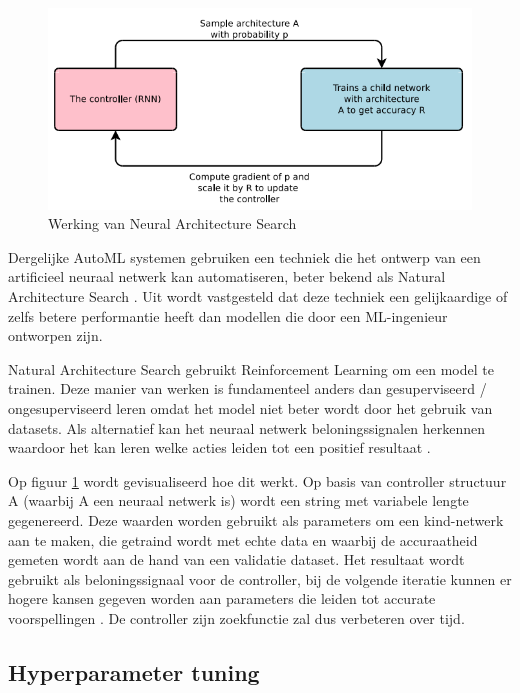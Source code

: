 \begin{figure}
    \includegraphics[width=\linewidth]{img/nas.png}
    \caption{Werking van Neural Architecture Search}
    \label{fig:nas}
\end{figure}

Dergelijke AutoML systemen gebruiken een techniek die het ontwerp van een artificieel neuraal netwerk kan automatiseren, beter bekend als Natural Architecture Search \autocite{Elsken2019}. Uit \textcite{ZophL2016} wordt vastgesteld dat deze techniek een gelijkaardige of zelfs betere performantie heeft dan modellen die door een ML-ingenieur ontworpen zijn.

Natural Architecture Search gebruikt Reinforcement Learning om een model te trainen. Deze manier van werken is fundamenteel anders dan gesuperviseerd / ongesuperviseerd leren omdat het model niet beter wordt door het gebruik van datasets. Als alternatief kan het neuraal netwerk beloningssignalen herkennen waardoor het kan leren welke acties leiden tot een positief resultaat \autocite{Lievens2019}.

Op figuur \ref{fig:nas} wordt gevisualiseerd hoe dit werkt. Op basis van controller structuur A (waarbij A een neuraal netwerk is) wordt een string met variabele lengte gegenereerd. Deze waarden worden gebruikt als parameters om een kind-netwerk aan te maken, die getraind wordt met echte data en waarbij de accuraatheid gemeten wordt aan de hand van een validatie dataset. Het resultaat wordt gebruikt als beloningssignaal voor de controller, bij de volgende iteratie kunnen er hogere kansen gegeven worden aan parameters die leiden tot accurate voorspellingen \autocite{ZophL2016}. De controller zijn zoekfunctie zal dus verbeteren over tijd.

\subsection{Hyperparameter tuning}

